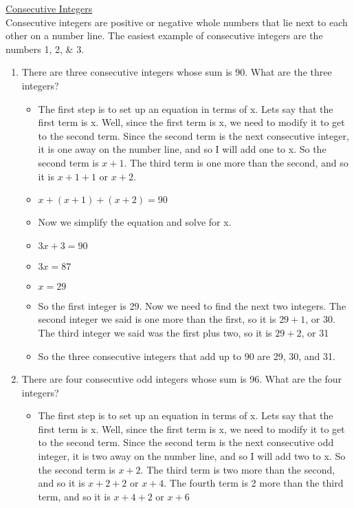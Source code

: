 \documentclass{article}
\begin{document}
\newpage
\underline{Consecutive Integers} \\
Consecutive integers are positive or negative whole numbers that lie next to each other on a number line. 
The easiest example of consecutive integers are the numbers 1, 2, \& 3.

\begin{enumerate}
\item There are three consecutive integers whose sum is 90. What are the three integers?
  \begin{itemize}
  \item The first step is to set up an equation in terms of x. Lets say that the first term is x. Well, since the first term is x, we need to modify it to get to the second term. Since the second term is the next consecutive integer, it is one away on the number line, and so I will add one to x. So the second term is $x+1$. The third term is one more than the second, and so it is $x+1+1$ or $x+2$.
  \item [] $x+(x+1)+(x+2)=90$
  \item Now we simplify the equation and solve for x.
  \item [] $3x+3=90$
  \item [] $3x=87$
  \item [] $x=29$
  \item So the first integer is 29. Now we need to find the next two integers. The second integer we said is one more than the first, so it is $29+1$, or 30. The third integer we said was the first plus two, so it is $29+2$, or 31
  \item So the three consecutive integers that add up to 90 are 29, 30, and 31.
  \end{itemize}
\item There are four consecutive odd integers whose sum is 96. What are the four integers?
  \begin{itemize}
  \item The first step is to set up an equation in terms of x. Lets say that the first term is x. Well, since the first term is x, we need to modify it to get to the second term. Since the second term is the next consecutive odd integer, it is two away on the number line, and so I will add two to x. So the second term is $x+2$. The third term is two more than the second, and so it is $x+2+2$ or $x+4$. The fourth term is 2 more than the third term, and so it is $x+4+2$ or $x+6$

\end{itemize}
\end{enumerate}
\end{document}
